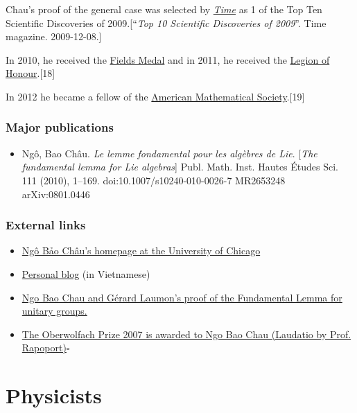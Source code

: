 \documentclass{book}
\numberwithin{equation}{section}
\begin{document}
Chau's proof of the general case was selected by \href{https://en.wikipedia.org/wiki/Time_(magazine)}{\textit{Time}} as 1 of the Top Ten Scientific Discoveries of 2009.[``\textit{Top 10 Scientific Discoveries of 2009}''. Time magazine. 2009-12-08.]

In 2010, he received the \href{https://en.wikipedia.org/wiki/Fields_Medal}{Fields Medal} and in 2011, he received the \href{https://en.wikipedia.org/wiki/Legion_of_Honour}{Legion of Honour}.[18]

In 2012 he became a fellow of the \href{https://en.wikipedia.org/wiki/American_Mathematical_Society}{American Mathematical Society}.[19]

\section{Major publications}
\begin{itemize}
    \item Ngô, Bao Châu. \textit{Le lemme fondamental pour les algèbres de Lie}. [\textit{The fundamental lemma for Lie algebras}] Publ. Math. Inst. Hautes Études Sci. 111 (2010), 1--169. doi:10.1007/s10240-010-0026-7 MR2653248 arXiv:0801.0446
\end{itemize}

\section{External links}
\begin{itemize}
    \item \href{http://www.math.uchicago.edu/~ngo/nbc-homepage.html}{Ngô Bảo Châu's homepage at the University of Chicago}
    \item \href{https://web.archive.org/web/20130102171548/http://ngobaochau.wordpress.com/}{Personal blog} (in Vietnamese)
    \item \href{https://arxiv.org/abs/math/0404454}{Ngo Bao Chau and Gérard Laumon's proof of the Fundamental Lemma for unitary groups.}
    \item \href{https://web.archive.org/web/20090306143328/http://www.mfo.de/programme/prize/Ngo2008.pdf}{The Oberwolfach Prize 2007 is awarded to Ngo Bao Chau (Laudatio by Prof. Rapoport)}\hfill$\square$
\end{itemize}


\part{Physicists}
\end{document}
